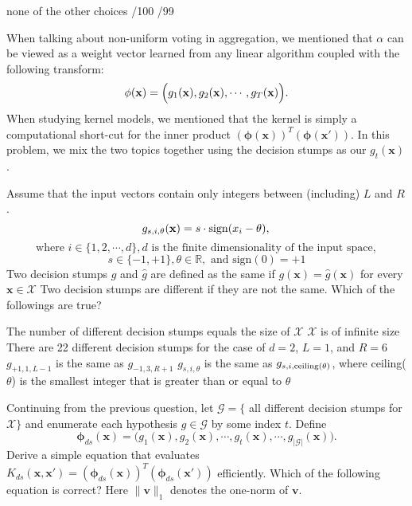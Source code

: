 \documentclass[a4paper,10pt]{exam}
\begin{document}
\begin{questions}
	\begin{checkboxes}
		\choice none of the other choices
		/100
		/99
		\\
	\end{checkboxes}

	\question When talking about non-uniform voting in aggregation, we mentioned that $\alpha$ can be viewed as a weight vector learned from any linear algorithm coupled with the following transform:
	\[\mathbf{\phi}(\mathbf{x}) = \Bigl(g_1(\mathbf{x}), g_2(\mathbf{x}), \cdots, g_T(\mathbf{x})\Bigr).\]
	When studying kernel models, we mentioned that the kernel is simply a computational short-cut for the inner product $(\mathbf{\phi}(\mathbf{x}))^T (\mathbf{\phi}(\mathbf{x}'))$. In this problem, we mix the two topics together using the decision stumps as our $g_t(\mathbf{x})$.

	Assume that the input vectors contain only integers between (including) $L$ and $R$.
	\[{g_{s,i,\theta }}({\bf{x}}) = s \cdot {\rm{sign}}({x_i} - \theta ),{\rm{ }}\]
	\[{\mbox{where }}i \in \{ 1,2, \cdots ,d\} ,d{\mbox{ is the finite  dimensionality of the input space}},\]
	\[s \in \{  - 1, + 1\} ,\theta  \in \mathbb{R} ,{\mbox{ and sign}}(0) =  + 1\]
	Two decision stumps $g$ and $\hat{g}$ are defined as the same if $g(\mathbf{x}) = \hat{g}(\mathbf{x})$ for every $\mathbf{x} \in \mathcal{X}$ Two decision stumps are different if they are not the same. Which of the followings are true?

	\begin{checkboxes}
		\choice The number of different decision stumps equals the size of $\mathcal{X}$
		\choice $\mathcal{X}$ is of infinite size
		\CorrectChoice There are 22 different decision stumps for the case of $d=2$, $L=1$, and $R=6$
		\CorrectChoice $g_{+1, 1, L-1}$ is the same as $g_{-1, 3, R+1}$
		\CorrectChoice $g_{s, i, \theta}$ is the same as $g_{s, i, \rm{ceiling}(\theta)}$, where ceiling($\theta$) is the smallest integer that is greater than or equal to $\theta$
	\end{checkboxes}

	\question Continuing from the previous question, let $\mathcal{G} = \{$ all different decision stumps for $\mathcal{X} \}$ and enumerate each hypothesis $g \in \mathcal{G}$ by some index $t$. Define
	\[\mathbf{\phi}_{ds}(\mathbf{x}) = \Biggl(g_1(\mathbf{x}), g_2(\mathbf{x}), \cdots, g_t(\mathbf{x}), \cdots, g_{|\mathcal{G}|}(\mathbf{x})\Biggr).\]
	Derive a simple equation that evaluates $K_{ds}(\mathbf{x}, \mathbf{x}') = (\mathbf{\phi}_{ds}(\mathbf{x}))^T (\mathbf{\phi}_{ds}(\mathbf{x}'))$ efficiently. Which of the following equation is correct? Here $\|\mathbf{v}\|_1$ denotes the one-norm of $\mathbf{v}$.


\end{questions}
\end{document}
